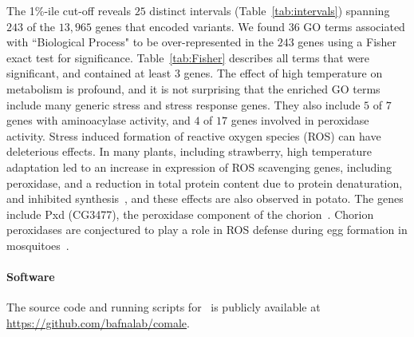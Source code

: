 \documentclass[11pt]{article}
\def\comale{\text{{\sc Comale}}}
\begin{document}
The 1\%-ile cut-off reveals $25$ distinct intervals 
(Table~\ref{tab:intervals})  spanning $243$ of 
the $13,965$ genes that encoded
variants. We found $36$ GO terms associated with ``Biological Process" to be 
over-represented in the $243$ genes using a Fisher exact
test for significance. Table~\ref{tab:Fisher} describes all terms that
were significant, and contained at least $3$ genes. The
effect of high temperature on metabolism is profound, and it is not
surprising that the enriched GO terms include many generic stress and
stress response genes. They also include $5$ of $7$ genes with
aminoacylase activity, and $4$ of $17$ genes involved in peroxidase
activity. Stress induced formation of reactive oxygen species (ROS)
can have deleterious effects. In many plants, including strawberry,
high temperature adaptation led to an increase in expression of ROS
scavenging genes, including peroxidase, and a reduction in total
protein content due to protein denaturation, and inhibited
synthesis~\cite{gulen2004effect}, and these effects are also observed in
potato. The genes include Pxd (CG3477), the peroxidase component of the
chorion~\cite{konstandi2005enzymatic}. Chorion peroxidases are conjectured
to play a role in ROS defense during egg formation in 
mosquitoes~\cite{li2006major}. 

\paragraph{Software}
The source code and running scripts for \comale\ is publicly available at \\
\href{https://github.com/bafnalab/comale}{https://github.com/bafnalab/comale}.
\end{document}
